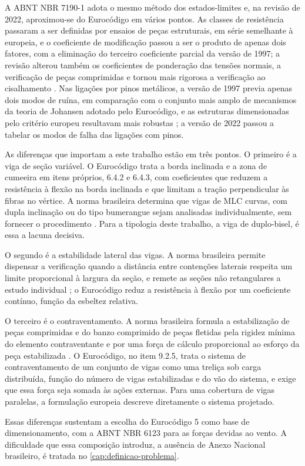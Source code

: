 A ABNT NBR 7190-1 \cite{NBR7190-1:2022} adota o mesmo método dos
estados-limites e, na revisão de 2022, aproximou-se do Eurocódigo em vários
pontos. As classes de resistência passaram a ser definidas por ensaios de peças
estruturais, em série semelhante à europeia, e o coeficiente de modificação
passou a ser o produto de apenas dois fatores, com a eliminação do terceiro
coeficiente parcial da versão de 1997; a revisão alterou também os coeficientes
de ponderação das tensões normais, a verificação de peças comprimidas e tornou
mais rigorosa a verificação ao cisalhamento \cite{jornada:2024}. Nas ligações
por pinos metálicos, a versão de 1997 previa apenas dois modos de ruína, em comparação com
o conjunto mais amplo de mecanismos da teoria de Johansen adotado pelo
Eurocódigo, e as estruturas dimensionadas pelo critério europeu resultavam mais
robustas \cite{baena:2015, carneiro:2021}; a versão de 2022 passou a tabelar os
modos de falha das ligações com pinos.

As diferenças que importam a este trabalho estão em três pontos. O primeiro é a
viga de seção variável. O Eurocódigo trata a borda inclinada e a zona de
cumeeira em itens próprios, 6.4.2 e 6.4.3, com coeficientes que reduzem a
resistência à flexão na borda inclinada e que limitam a tração perpendicular às
fibras no vértice. A norma brasileira determina que vigas de MLC curvas, com
dupla inclinação ou do tipo bumerangue sejam analisadas individualmente, sem
fornecer o procedimento \cite{NBR7190-1:2022}. Para a tipologia deste trabalho,
a viga de duplo-bisel, é essa a lacuna decisiva.

O segundo é a estabilidade lateral das vigas. A norma brasileira permite
dispensar a verificação quando a distância entre contenções laterais respeita um
limite proporcional à largura da seção, e remete as seções não retangulares a
estudo individual \cite{NBR7190-1:2022}; o Eurocódigo reduz a resistência à
flexão por um coeficiente contínuo, função da esbeltez relativa.

O terceiro é o contraventamento. A norma brasileira formula a estabilização de
peças comprimidas e do banzo comprimido de peças fletidas pela rigidez mínima do
elemento contraventante e por uma força de cálculo proporcional ao esforço da
peça estabilizada \cite{NBR7190-1:2022}. O Eurocódigo, no item 9.2.5, trata o
sistema de contraventamento de um conjunto de vigas como uma treliça sob carga
distribuída, função do número de vigas estabilizadas e do vão do sistema, e
exige que essa força seja somada às ações externas. Para uma cobertura de vigas
paralelas, a formulação europeia descreve diretamente o sistema projetado.

Essas diferenças sustentam a escolha do Eurocódigo 5 como base de
dimensionamento, com a ABNT NBR 6123 \cite{NBR6123:2023} para as forças devidas
ao vento. A dificuldade que essa composição introduz, a ausência de Anexo
Nacional brasileiro, é tratada no \autoref{cap:definicao-problema}.
